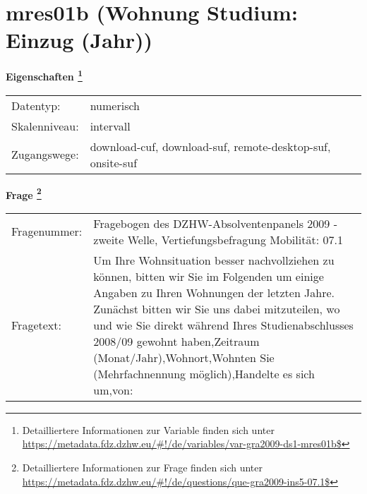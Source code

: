 
    \setcounter{footnote}{0}

    \vspace*{-1.8cm}
	\section{mres01b (Wohnung Studium: Einzug (Jahr))}
	\label{section:mres01b}



    \vspace*{0.5cm}
    \noindent\textbf{Eigenschaften
	\footnote{Detailliertere Informationen zur Variable finden sich unter
		\url{https://metadata.fdz.dzhw.eu/\#!/de/variables/var-gra2009-ds1-mres01b$}}}\\
	\begin{tabularx}{\hsize}{@{}lX}
	Datentyp: & numerisch \\
	Skalenniveau: & intervall \\
	Zugangswege: &
	  download-cuf, 
	  download-suf, 
	  remote-desktop-suf, 
	  onsite-suf
 \\
    \end{tabularx}



				\vspace*{0.5cm}
                \noindent\textbf{Frage
	                \footnote{Detailliertere Informationen zur Frage finden sich unter
		              \url{https://metadata.fdz.dzhw.eu/\#!/de/questions/que-gra2009-ins5-07.1$}}}\\
				\begin{tabularx}{\hsize}{@{}lX}
					Fragenummer: &
					  Fragebogen des DZHW-Absolventenpanels 2009 - zweite Welle, Vertiefungsbefragung Mobilität:
					  07.1
 \\
					Fragetext: & Um Ihre Wohnsituation besser nachvollziehen zu können, bitten wir Sie im Folgenden um einige Angaben zu Ihren Wohnungen der letzten Jahre. Zunächst bitten wir Sie uns dabei mitzuteilen, wo und wie Sie direkt während Ihres Studienabschlusses 2008/09 gewohnt haben,Zeitraum (Monat/Jahr),Wohnort,Wohnten Sie (Mehrfachnennung möglich),Handelte es sich um,von: \\
				\end{tabularx}





